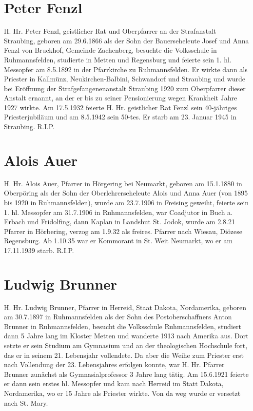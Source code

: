 \documentclass[12pt,a4pager]{book}
\begin{document}
\section{Peter Fenzl}

H. Hr. Peter Fenzl, geistlicher Rat und Oberpfarrer an der Strafanstalt
Straubing, geboren am 29.6.1866 als der Sohn der Bauerseheleute Josef und Anna
Fenzl von Bruckhof, Gemeinde Zachenberg, besuchte die Volksschule in
Ruhmannsfelden, studierte in Metten und Regensburg und feierte sein 1. hl.
Messopfer am 8.5.1892 in der Pfarrkirche zu Ruhmannsfelden. Er wirkte dann als
Priester in Kallmünz, Neukirchen-Balbini, Schwandorf und Straubing und wurde bei
Eröffnung der Strafgefangenenanstalt Straubing 1920 zum Oberpfarrer dieser
Anstalt ernannt, an der er bis zu seiner Pensionierung wegen Krankheit Jahre
1927 wirkte. Am 17.5.1932 feierte H. Hr. geistlicher Rat Fenzl sein 40-jähriges
Priesterjubiläum und am 8.5.1942 sein 50-tes. Er starb am 23. Januar 1945 in
Straubing. R.I.P.

\section{Alois Auer}

H. Hr. Alois Auer, Pfarrer in Hörgering bei Neumarkt, geboren am 15.1.1880 in
Oberpöring als der Sohn der Oberlehrerseheleute Alois und Anna Auer (von 1895
bis 1920 in Ruhmannsfelden), wurde am 23.7.1906 in Freising geweiht, feierte
sein 1. hl. Messopfer am 31.7.1906 in Ruhmannsfelden, war Coadjutor in Buch a.
Erbach und Fridolfing, dann Kaplan in Landshut St. Jodok, wurde am 2.8.21
Pfarrer in Hörbering, verzog am 1.9.32 als freires. Pfarrer nach Wiesau, Diözese
Regensburg. Ab 1.10.35 war er Kommorant in St. Weit Neumarkt, wo er am
17.11.1939 starb. R.I.P.

\section{Ludwig Brunner}

H. Hr. Ludwig Brunner, Pfarrer in Herreid, Staat Dakota, Nordamerika, geboren am
30.7.1897 in Ruhmannsfelden als der Sohn des Postoberschaffners Anton Brunner in
Ruhmannsfelden, besucht die Volksschule Ruhmannsfelden, studiert dann 5 Jahre
lang im Kloster Metten und wanderte 1913 nach Amerika aus. Dort setzte er sein
Studium am Gymnasium und an der theologischen Hochschule fort, das er in seinem
21. Lebensjahr vollendete. Da aber die Weihe zum Priester erst nach Vollendung
der 23. Lebensjahres erfolgen konnte, war H. Hr. Pfarrer Brunner zunächst als
Gymnasialprofessor 3 Jahre lang tätig. Am 15.6.1921 feierte er dann sein erstes
hl. Messopfer und kam nach Herreid im Statt Dakota, Nordamerika, wo er 15 Jahre
als Priester wirkte. Von da weg wurde er versetzt nach St. Mary.
\end{document}
